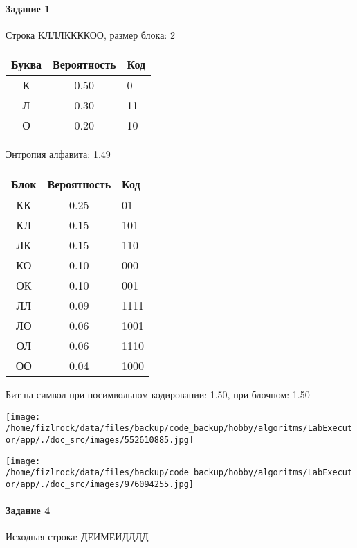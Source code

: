 \documentclass[a4paper, 12pt]{article}
\begin{document}
\paragraph{Задание 1}

Строка КЛЛЛККККОО, размер блока: 2
\begin{center}
 \begin{tabular}{ |c|c|l| } 
  \hline
     Буква & Вероятность & Код\\ \hline
К & 0.50 & 0\\\hline
Л & 0.30 & 11\\\hline
О & 0.20 & 10
\\ \hline \end{tabular}
\end{center}
Энтропия алфавита: 1.49
\begin{center}
 \begin{tabular}{ |c|c|l| } 
  \hline
     Блок & Вероятность & Код\\ \hline
КК & 0.25 & 01\\\hline
КЛ & 0.15 & 101\\\hline
ЛК & 0.15 & 110\\\hline
КО & 0.10 & 000\\\hline
ОК & 0.10 & 001\\\hline
ЛЛ & 0.09 & 1111\\\hline
ЛО & 0.06 & 1001\\\hline
ОЛ & 0.06 & 1110\\\hline
ОО & 0.04 & 1000
\\ \hline \end{tabular}
\end{center}
Бит на символ при посимвольном кодировании: 1.50, при блочном: 1.50

\texttt{[image: /home/fizlrock/data/files/backup/code\_backup/hobby/algoritms/LabExecutor/app/./doc\_src/images/552610885.jpg]}

\texttt{[image: /home/fizlrock/data/files/backup/code\_backup/hobby/algoritms/LabExecutor/app/./doc\_src/images/976094255.jpg]}
\paragraph{Задание 4}


Исходная строка: ДЕИМЕИДДДД
\end{document}
